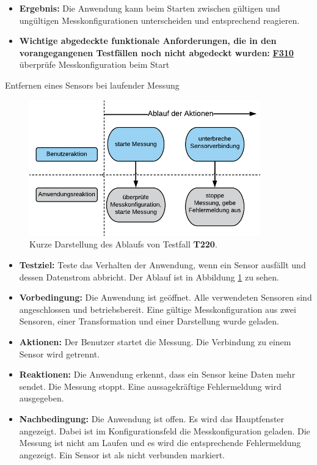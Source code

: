 \documentclass[parskip=full]{scrartcl}
\begin{document}
\begin{description}
\begin{itemize}
\item []\textbf{Ergebnis:} Die Anwendung kann beim Starten zwischen gültigen und ungültigen Messkonfigurationen unterscheiden und entsprechend reagieren.
\item []\textbf{Wichtige abgedeckte funktionale Anforderungen, die in den vorangegangenen Testfällen noch nicht abgedeckt wurden:} \hyperlink{link-f310}{\textbf{F310}} überprüfe Messkonfiguration beim Start

\end{itemize}

\hypertarget{link-t220}{\item[T220]} Entfernen eines Sensors bei laufender Messung

\begin{figure}[htbp]
	\begin{center}
		\includegraphics[width = 10cm]{Grafik/T220-Ablauf.png}
		\caption{Kurze Darstellung des Ablaufs von Testfall \textbf{T220}.}
		\label{T220-Ablauf}
	\end{center}
\end{figure}
\begin{itemize}

\item []\textbf{Testziel:} Teste das Verhalten der Anwendung, wenn ein Sensor ausfällt und dessen Datenstrom abbricht. Der Ablauf ist in Abbildung \ref{T220-Ablauf} zu sehen.

\item []\textbf{Vorbedingung:} Die Anwendung ist geöffnet. Alle verwendeten Sensoren sind angeschlossen und betriebsbereit. Eine gültige Messkonfiguration aus zwei Sensoren, einer Transformation und einer Darstellung wurde geladen.
\item []\textbf{Aktionen:} Der Benutzer startet die Messung. Die Verbindung zu einem Sensor wird getrennt.
\item []\textbf{Reaktionen:} Die Anwendung erkennt, dass ein Sensor keine Daten mehr sendet. Die Messung stoppt. Eine aussagekräftige Fehlermeldung wird ausgegeben.
\item []\textbf{Nachbedingung:} Die Anwendung ist offen. Es wird das Hauptfenster angezeigt. Dabei ist im Konfigurationsfeld die Messkonfiguration geladen. Die Messung ist nicht am Laufen und es wird die entsprechende Fehlermeldung angezeigt. Ein Sensor ist als nicht verbunden markiert.


\end{itemize}
\end{description}
\end{document}
